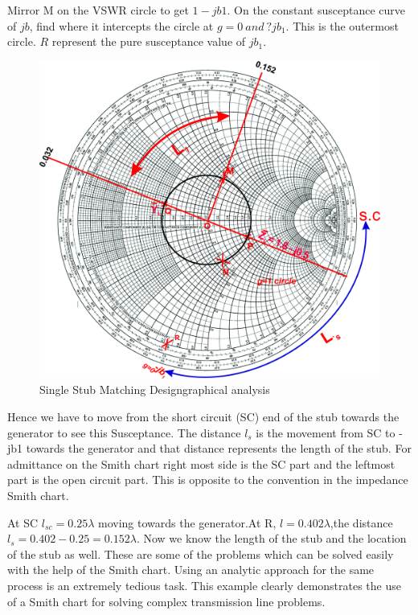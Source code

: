 \begin{exmp}
Mirror M on the VSWR circle to get $1-jb1$. On the constant susceptance curve of $jb$, find where it intercepts the circle at $g=0 \ and \ ?jb_1$. This is the outermost circle. $R$ represent the pure susceptance value of $jb_1$. 
\begin{figure}[h]
\centering
\includegraphics[width=1\linewidth]{./graphics/fig14}
\caption{Single Stub Matching Design\textemdash\;graphical analysis}
\label{fig:fig14}
\end{figure}

Hence we have to move from the short circuit (SC) end of the stub towards the generator to see this Susceptance. The distance $l_s$ is the movement from SC to -jb1 towards the generator and that distance represents the length of the stub. For admittance on the Smith chart right most side is the SC part and the leftmost part is the open circuit part. This is opposite to the convention in the impedance Smith chart.

At SC $l_{sc}=0.25\lambda$ moving towards the generator.At R, $l=0.402\lambda$,the distance $l_s=0.402-0.25=0.152\lambda$. Now we know the length of the stub and the location of the stub as well. These are some of the problems which can be solved easily with the help of the Smith chart. Using an analytic approach for the same process is an extremely tedious task. This example clearly demonstrates the use of a Smith chart for solving complex transmission line problems.
\end{exmp}

